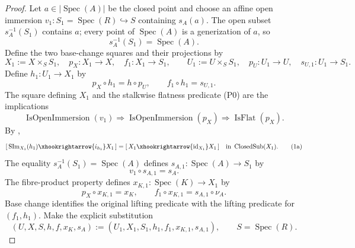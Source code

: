 \begin{proof}
  Let $a\in|\operatorname{Spec}(A)|$ be the closed point and choose an affine
  open immersion
  $v_1\colon S_1=\operatorname{Spec}(R)\hookrightarrow S$ containing
  $s_A(a)$.  The open
  subset $s_A^{-1}(S_1)$ contains $a$; every point of
  $\operatorname{Spec}(A)$ is a generization of $a$, so
  \[
    s_A^{-1}(S_1)=\operatorname{Spec}(A).
  \]
  Define the two base-change squares and their projections by
  \[
    X_1:=X\times_SS_1,\quad
    p_X\colon X_1\to X,\quad f_1\colon X_1\to S_1,
    \qquad
    U_1:=U\times_SS_1,\quad
    p_U\colon U_1\to U,\quad s_{U,1}\colon U_1\to S_1.
  \]
  Define $h_1\colon U_1\to X_1$ by
  \[
    p_X\circ h_1=h\circ p_U,\qquad
    f_1\circ h_1=s_{U,1}.                                       \tag{0d}
  \]
  The square defining $X_1$ and the stalkwise flatness predicate (P0) are the
  implications
  \[
    \operatorname{IsOpenImmersion}(v_1)
      \Longrightarrow\operatorname{IsOpenImmersion}(p_X)
      \Longrightarrow\operatorname{IsFlat}(p_X).
  \]
  By ,
  \[
    [\,\operatorname{SIm}_{X_1}(h_1)\xhookrightarrow{i_{h_1}}X_1\,]
      =[\,X_1\xhookrightarrow{\operatorname{id}_{X_1}}X_1\,]
      \quad\text{in }\operatorname{ClosedSub}(X_1).             \tag{1a}
  \]
  The equality $s_A^{-1}(S_1)=\operatorname{Spec}(A)$ defines
  $s_{A,1}\colon\operatorname{Spec}(A)\to S_1$ by
  \[
    v_1\circ s_{A,1}=s_A.
  \]
  The fibre-product property defines
  $x_{K,1}\colon\operatorname{Spec}(K)\to X_1$ by
  \[
    p_X\circ x_{K,1}=x_K,\qquad
    f_1\circ x_{K,1}=s_{A,1}\circ\nu_A.                          \tag{0e}
  \]
  Base change identifies the original lifting predicate with the lifting
  predicate for $(f_1,h_1)$.  Make the explicit substitution
  \[
    (U,X,S,h,f,x_K,s_A)
      :=(U_1,X_1,S_1,h_1,f_1,x_{K,1},s_{A,1}),
    \qquad S=\operatorname{Spec}(R).
  \]


\end{proof}
